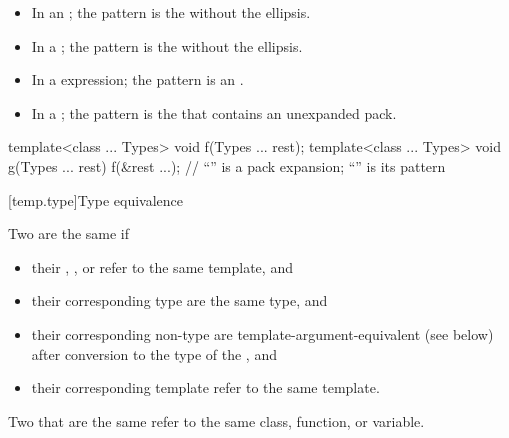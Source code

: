 \documentclass{wg21}
\begin{document}
\begin{itemize}
\item In an ; the pattern is
the  without the ellipsis.

\item In a ; the pattern is
the  without the ellipsis.

\item In a  expression; the pattern is an
.

\item In a ;
the pattern is the 
that contains an unexpanded pack.
\end{itemize}

\begin{example}
    \begin{codeblock}
        template<class ... Types> void f(Types ... rest);
        template<class ... Types> void g(Types ... rest) {
            f(&rest ...);     // ``'' is a pack expansion; ``'' is its pattern
        }
    \end{codeblock}
\end{example}


[temp.type]{Type equivalence}

\pnum
{}%
Two  are the same if
\begin{itemize}
\item
their ,
, or
refer to the same template, and

\item
their corresponding type 
are the same type, and

\item
their corresponding non-type 
are template-argument-equivalent (see below)
after conversion to the type of the , and

\item
their corresponding template 
refer to the same template.
\end{itemize}
Two  that are the same
refer to the same class, function, or variable.
\end{document}
